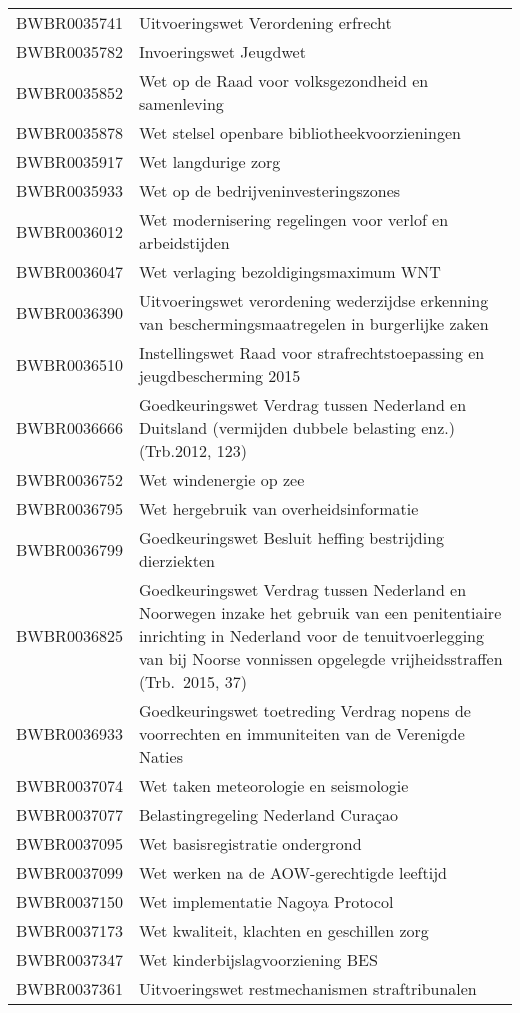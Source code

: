 \begin{longtable}{lp{}}
BWBR0035741 & Uitvoeringswet Verordening erfrecht \\
BWBR0035782 & Invoeringswet Jeugdwet \\
BWBR0035852 & Wet op de Raad voor volksgezondheid en samenleving \\
BWBR0035878 & Wet stelsel openbare bibliotheekvoorzieningen \\
BWBR0035917 & Wet langdurige zorg \\
BWBR0035933 & Wet op de bedrijveninvesteringszones  \\
BWBR0036012 & Wet modernisering regelingen voor verlof en arbeidstijden \\
BWBR0036047 & Wet verlaging bezoldigingsmaximum WNT \\
BWBR0036390 & Uitvoeringswet verordening wederzijdse erkenning van beschermingsmaatregelen in burgerlijke zaken \\
BWBR0036510 &  Instellingswet Raad voor strafrechtstoepassing en jeugdbescherming 2015 \\
BWBR0036666 & Goedkeuringswet Verdrag tussen Nederland en Duitsland (vermijden dubbele belasting enz.)(Trb.2012, 123) \\
BWBR0036752 & Wet windenergie op zee \\
BWBR0036795 & Wet hergebruik van overheidsinformatie \\
BWBR0036799 & Goedkeuringswet Besluit heffing bestrijding dierziekten \\
BWBR0036825 & Goedkeuringswet Verdrag tussen Nederland en Noorwegen inzake het gebruik van een penitentiaire inrichting in Nederland voor de tenuitvoerlegging van bij Noorse vonnissen opgelegde vrijheidsstraffen (Trb. 2015, 37) \\
BWBR0036933 & Goedkeuringswet toetreding Verdrag nopens de voorrechten en immuniteiten van de Verenigde Naties \\
BWBR0037074 & Wet taken meteorologie en seismologie \\
BWBR0037077 & Belastingregeling Nederland Curaçao \\
BWBR0037095 & Wet basisregistratie ondergrond \\
BWBR0037099 & Wet werken na de AOW-gerechtigde leeftijd \\
BWBR0037150 & Wet implementatie Nagoya Protocol \\
BWBR0037173 & Wet kwaliteit, klachten en geschillen zorg  \\
BWBR0037347 & Wet kinderbijslagvoorziening BES \\
BWBR0037361 & Uitvoeringswet restmechanismen straftribunalen \\

\end{longtable}
